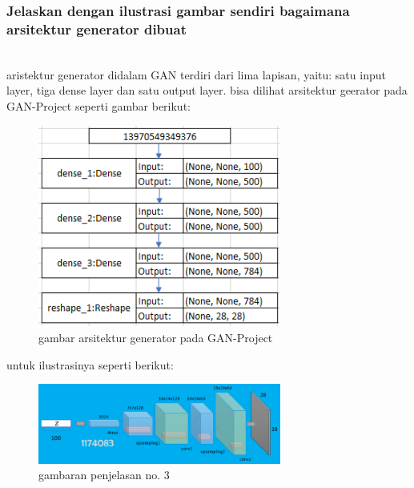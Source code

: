 \subsubsection{Jelaskan dengan ilustrasi gambar sendiri bagaimana arsitektur generator dibuat}
\hfill\\
aristektur generator didalam GAN terdiri dari lima lapisan, yaitu: satu input layer, tiga dense layer dan satu output layer. bisa dilihat arsitektur geerator pada GAN-Project seperti gambar berikut:
\begin{figure}[H]
	\centering
	\includegraphics[width=8cm]{figures/1174083/figures8/3a.png}
	\caption{gambar arsitektur generator pada GAN-Project}
\end{figure}
untuk ilustrasinya seperti berikut:
\begin{figure}[H]
	\centering
	\includegraphics[width=8cm]{figures/1174083/figures8/3.png}
	\caption{gambaran penjelasan no. 3}
\end{figure}


